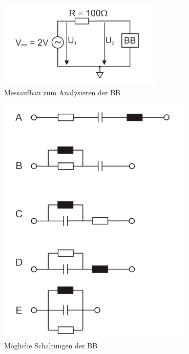\documentclass[10pt]{report}
\begin{document}
        \begin{center}
            \begin{figure}[H]
                \includegraphics[width=\textwidth]{Abbildung20.png}
                \caption{Messaufbau zum Analysieren der BB}
                \label{fig:abb20}
            \end{figure}
            \begin{figure}[H]
                \includegraphics[width=\textwidth]{Abbildung21.png}
                \caption{Mögliche Schaltungen der BB}
                \label{fig:abb21}
            \end{figure}
        \end{center}
\end{document}
